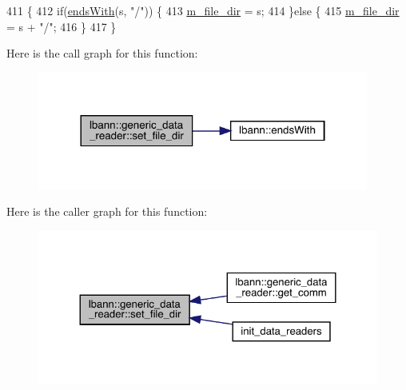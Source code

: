 \begin{DoxyCode}
411                                                   \{
412   \textcolor{keywordflow}{if}(\hyperlink{namespacelbann_a02f197bc772ef04f1ac51eb191a02cab}{endsWith}(s, \textcolor{stringliteral}{"/"})) \{
413     \hyperlink{classlbann_1_1generic__data__reader_a252002ec211d67606b80bc481a27e820}{m\_file\_dir} = s;
414   \}\textcolor{keywordflow}{else} \{
415     \hyperlink{classlbann_1_1generic__data__reader_a252002ec211d67606b80bc481a27e820}{m\_file\_dir} = s + \textcolor{stringliteral}{"/"};
416   \}
417 \}
\end{DoxyCode}
Here is the call graph for this function\+:\nopagebreak
\begin{figure}[H]
\begin{center}
\leavevmode
\includegraphics[width=308pt]{classlbann_1_1generic__data__reader_a94a6db0b62d4c98202ef309eb76b220c_cgraph}
\end{center}
\end{figure}
Here is the caller graph for this function\+:\nopagebreak
\begin{figure}[H]
\begin{center}
\leavevmode
\includegraphics[width=324pt]{classlbann_1_1generic__data__reader_a94a6db0b62d4c98202ef309eb76b220c_icgraph}
\end{center}
\end{figure}
\mbox{\label{classlbann_1_1generic__data__reader_aca4e6c31df0a1579079274bc48fbbf26}} 
